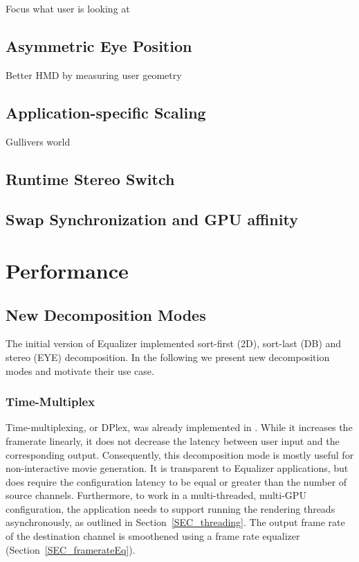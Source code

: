 \documentclass[journal]{vgtc}                %
\newcommand{\sref}[1]{Section~\ref{#1}}
\begin{document}
Focus what user is looking at

\subsection{Asymmetric Eye Position}

Better HMD by measuring user geometry

\subsection{Application-specific Scaling}

Gullivers world

\subsection{Runtime Stereo Switch}

\subsection{Swap Synchronization and GPU affinity}

\section{Performance}

\subsection{New Decomposition Modes}

The initial version of Equalizer implemented sort-first (2D), sort-last (DB) and
stereo (EYE) decomposition. In the following we present new decomposition modes
and motivate their use case.

\subsubsection{Time-Multiplex}

Time-multiplexing, or DPlex, was already implemented in \cite{BRE:05}. While it
increases the framerate linearly, it does not decrease the latency between user
input and the corresponding output. Consequently, this decomposition mode is
mostly useful for non-interactive movie generation. It is transparent to
Equalizer applications, but does require the configuration latency to be equal
or greater than the number of source channels. Furthermore, to work in a
multi-threaded, multi-GPU configuration, the application needs to support
running the rendering threads asynchronously, as outlined in
\sref{SEC_threading}. The output frame rate of the destination channel is
smoothened using a frame rate equalizer (\sref{SEC_framerateEq}).
\end{document}
